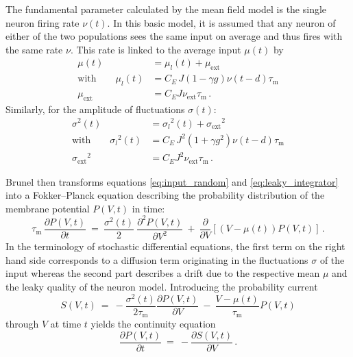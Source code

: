 The fundamental parameter calculated by the mean field model is the single neuron
firing rate $\nu(t)$. In this basic model, it is assumed that any neuron of either 
of the two populations sees the same input on average and thus fires with the same 
rate $\nu$. This rate is linked to the average input $\mu(t)$ by
\begin{equation}
    \begin{split}
        \mu(t)          &= \mu_l(t) + \mu_\text{ext} \\
        \text{with} \qquad \mu_l(t)        &= C_E \, J (1 - \gamma g) \nu(t - d) \tau_\text{m} \\
        \mu_\text{ext}  &= C_E J \nu_\text{ext} \tau_\text{m} \,.
        \label{eq:mu}
    \end{split}
\end{equation}
Similarly, for the amplitude of fluctuations $\sigma(t)$:
\begin{equation}
    \begin{split}
        \sigma^2(t)     &= {\sigma_l}^2(t) + {\sigma_\text{ext}}^2 \\
        \text{with} \qquad {\sigma_l}^2(t)       
                        &= C_E \, J^2 (1 + \gamma g^2) \nu(t - d) \tau_\text{m} \\
        {\sigma_\text{ext}}^2  &= C_E J^2 \nu_\text{ext} \tau_\text{m} \,.
        \label{eq:sigma}
    \end{split}
\end{equation}



Brunel then transforms equations \eqref{eq:input_random} and \eqref{eq:leaky_integrator}
into a Fokker--Planck equation describing the probability distribution of the membrane 
potential $P(V, t)$ in time: 
\begin{equation}
    \tau_\text{m} \, \frac{\partial P(V, t)}{\partial t} 
       \: = \: \frac{\sigma^2(t)}{2}  \: \frac{\partial^2 P(V, t)}{\partial V^2} 
         \: + \: \frac{\partial }{\partial V}  [(V- \mu(t)) P(V, t)] \, .
    \label{eq:fokker_planck}
\end{equation}
In the terminology of stochastic differential equations, the first term on the 
right hand side corresponds to a diffusion term originating in the fluctuations $\sigma$ 
of the input whereas the second part describes a drift due to the respective mean $\mu$ 
and the leaky quality of the neuron model. Introducing the probability current 
\begin{equation}
    S(V, t) 
    \: = \: - \frac{\sigma^2(t)}{2 \tau_\text{m}} \frac{\partial P(V, t)}{\partial V}  
        \: - \: \frac{V - \mu(t)}{\tau_\text{m}} P(V, t)
    \label{eq:prob_curr}
\end{equation}
through $V$ at time $t$ yields the continuity equation 
\begin{equation}
    \frac{\partial P(V, t)}{\partial t} \:=\: - \frac{\partial S(V, t)}{\partial V} \,.
    \label{eq:continuity}
\end{equation}

